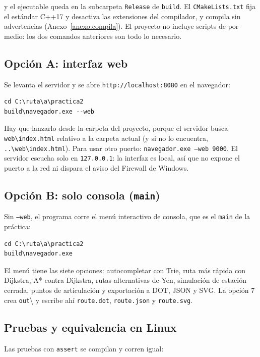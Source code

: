 \documentclass[11pt,a4paper]{article}
\newcommand{\arch}[1]{\texttt{#1}}
\begin{document}
y el ejecutable queda en la subcarpeta \arch{Release} de \arch{build}. El
\arch{CMakeLists.txt} fija el estándar C++17 y desactiva las extensiones del
compilador, y compila sin advertencias (Anexo~\ref{anexo:compila}). El proyecto
no incluye scripts de por medio: los dos comandos anteriores son todo lo
necesario.

\subsection*{Opción A: interfaz web}
Se levanta el servidor y se abre \arch{http://localhost:8080} en el navegador:

\begin{lstlisting}[style=term]
cd C:\ruta\a\practica2
build\navegador.exe --web
\end{lstlisting}

Hay que lanzarlo desde la carpeta del proyecto, porque el servidor busca
\arch{web\textbackslash{}index.html} relativo a la carpeta actual (y si no lo encuentra,
\arch{..\textbackslash{}web\textbackslash{}index.html}). Para usar otro puerto:
\arch{navegador.exe --web 9000}. El servidor escucha solo en
\arch{127.0.0.1}: la interfaz es local, así que no expone el puerto a la red ni
dispara el aviso del Firewall de Windows.

\subsection*{Opción B: solo consola (\arch{main})}
Sin \arch{--web}, el programa corre el menú interactivo de consola, que es el
\arch{main} de la práctica:

\begin{lstlisting}[style=term]
cd C:\ruta\a\practica2
build\navegador.exe
\end{lstlisting}

El menú tiene las siete
opciones: autocompletar con Trie, ruta más rápida con Dijkstra, A* contra
Dijkstra, rutas alternativas de Yen, simulación de estación cerrada, puntos de
articulación y exportación a DOT, JSON y SVG. La opción 7 crea
\arch{out}\textbackslash{} y escribe ahí \arch{route.dot}, \arch{route.json} y
\arch{route.svg}.

\subsection*{Pruebas y equivalencia en Linux}
Las pruebas con \arch{assert} se compilan y corren igual:
\end{document}
